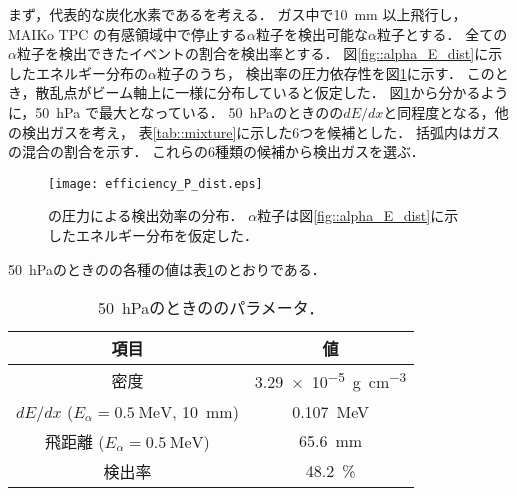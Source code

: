 \documentclass[../master]{subfiles}
\begin{document}
まず，代表的な炭化水素である\Methane を考える．
ガス中で\SI{10}{\milli\metre} 以上飛行し，MAIKo TPC の有感領域中で停止する$\alpha$粒子を検出可能な$\alpha$粒子とする．
全ての$\alpha$粒子を検出できたイベントの割合を検出率とする．
図\ref{fig::alpha_E_dist}に示したエネルギー分布の$\alpha$粒子のうち，
検出率の圧力依存性を図\ref{fig::efficiency_P_dist}に示す．
このとき，散乱点がビーム軸上に一様に分布していると仮定した．
図\ref{fig::efficiency_P_dist}から分かるように，\SI{50}{\hecto\pascal} で最大となっている．
\SI{50}{\hecto\pascal}のときの\Methane の$dE/dx$と同程度となる，他の検出ガスを考え，
表\ref{tab::mixture}に示した6つを候補とした．
括弧内はガスの混合の割合を示す．
これらの6種類の候補から検出ガスを選ぶ．
\begin{figure}
  \centering
  \texttt{[image: efficiency\_P\_dist.eps]}
  \caption[\Methane の圧力による検出効率の分布．]
          {\Methane の圧力による検出効率の分布．
            $\alpha$粒子は図\ref{fig::alpha_E_dist}に示したエネルギー分布を仮定した．
           }
  \label{fig::efficiency_P_dist}
\end{figure}
\SI{50}{\hecto\pascal}のときの\Methane の各種の値は表\ref{tab::CH4_50_params}のとおりである．
\begin{table}
  \centering
  \caption{\SI{50}{\hecto\pascal}のときの\Methane のパラメータ．}
  \label{tab::CH4_50_params}
  \begin{tabular}{cc}
    \toprule
    項目 & 値\\
    \midrule
    密度 & \SI{3.29e-5}{\gram\per\cubic\centi\metre} \\
    $dE/dx$ ($E_{\alpha} = \SI{0.5}{\mega\electronvolt}$, \SI{10}{\milli\metre}) & \SI{0.107}{\mega\electronvolt}\\
    飛距離 ($E_{\alpha} = \SI{0.5}{\mega\electronvolt}$) & \SI{65.6}{\milli\metre} \\
    検出率 & \SI{48.2}{\percent} \\
    \bottomrule
  \end{tabular}
\end{table}
\end{document}
